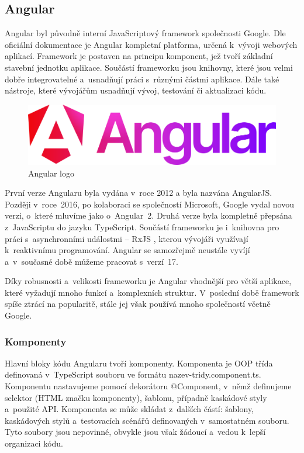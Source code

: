 \subsection{Angular}

Angular byl původně interní JavaScriptový framework společnosti Google. 
Dle oficiální dokumentace \cite{angulario} je Angular kompletní platforma, určená k~vývoji webových aplikací. 
Framework je postaven na principu komponent, jež tvoří základní stavební jednotku aplikace. 
Součástí frameworku jsou knihovny, které jsou velmi dobře integrovatelné a~usnadňují práci s~různými částmi aplikace. 
Dále také nástroje, které vývojářům usnadňují vývoj, testování či aktualizaci kódu.\cite{angulario,learningangular}

\begin{figure}[htb]
	\centering
		\includegraphics[width=.5\textwidth]{images/angular-logo.png}
	\caption[Angular logo]{Angular logo \cite{angulardev}}
	\label{fig:angularlogo}
\end{figure}

První verze Angularu byla vydána v~roce 2012 a byla nazvána AngularJS. 
Později v~roce~2016, po kolaboraci se společností Microsoft, Google vydal novou verzi, o~které mluvíme jako o~Angular~2. 
Druhá verze byla kompletně přepsána z~JavaScriptu do jazyku TypeScript. 
Součástí frameworku je i~knihovna pro práci s~asynchronními událostmi -- RxJS \cite{rxjslibrary}, kterou vývojáři využívají k~reaktivnímu programování. 
Angular se samozřejmě neustále vyvíjí a~v~současné době můžeme pracovat s~verzí~17.\cite{angulardev,learningangular}

Díky robusnosti a~velikosti frameworku je Angular vhodnější pro větší aplikace, které vyžadují mnoho funkcí a~komplexních struktur. 
V~poslední době framework spíše ztrácí na popularitě, stále jej však používá mnoho společností včetně Google.\cite{learningangular}

\subsubsection{Komponenty}

Hlavní bloky kódu Angularu tvoří komponenty. Komponenta je OOP třída definovaná v~TypeScript souboru ve formátu nazev-tridy.component.ts. 
Komponentu nastavujeme pomocí dekorátoru @Component, v~němž definujeme selektor (HTML značku komponenty), šablonu, případně kaskádové styly a~použité API. 
Komponenta se může skládat z~dalších částí: šablony, kaskádových stylů a~testovacích scénářů definovaných v~samostatném souboru. 
Tyto soubory jsou nepovinné, obvykle jsou však žádoucí a~vedou k~lepší organizaci kódu. 

